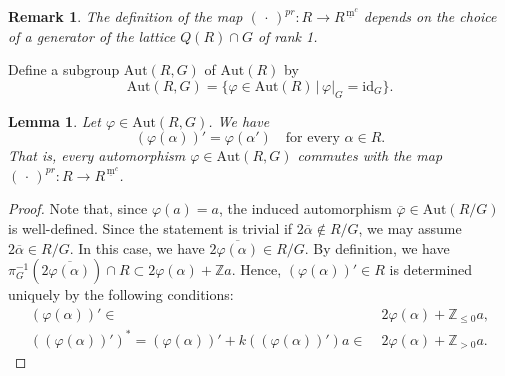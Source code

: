\documentclass[11pt]{amsart}
\newcommand{\Z}{\mathbb{Z}}
\newcommand{\Aut}{\mathrm{Aut}}
\newcommand{\mc}{\, \underline{\mathrm{m}}^c}
\newtheorem{lemma}[thm]{Lemma}%
\newtheorem{rem}[thm]{Remark}%
\begin{document}
{\begin{rem}\label{rem:a}
The definition of the map $(\,\cdot\,)^{pr}:R\to R^{\mc}$ depends on the choice of a 
generator of the lattice $Q(R)\cap G$ of rank 1.
\end{rem}

Define a subgroup $\Aut(R,G)$ of $\Aut(R)$ by
\[ \Aut(R,G)=\{\varphi\in \Aut(R)\,|\, \varphi|_G=\mathrm{id}_G\}.\]

\begin{lemma}\label{lemma:commutativity-prime}
Let $\varphi\in  \Aut(R,G)$. We have 
\begin{equation}\label{commutativity-prime}
(\varphi(\alpha))'=\varphi(\alpha')\quad  \text{for every $\alpha\in R$}.
\end{equation}
That is, every automorphism $\varphi\in \Aut(R,G)$ commutes with 
the map $(\,\cdot\, )^{pr}:R\to R^{\mc}$. 
\end{lemma}
\begin{proof}
Note that, since $\varphi(a)=a$, the induced automorphism 
$\overline{\varphi}\in\mathrm{Aut}(R/G)$ is well-defined. 
Since the statement is trivial if $2\overline{\alpha}\not\in R/G$, we may 
assume $2\overline{\alpha}\in R/G$. 
In this case, we have $2\overline{\varphi(\alpha)}\in R/G$. 
By definition, we have
$\pi_G^{-1}(2\overline{\varphi(\alpha)})\cap R\subset 2\varphi(\alpha)+\Z a$. 
Hence, $(\varphi(\alpha))'\in R$ is determined uniquely by the following conditions:
\begin{align*}
(\varphi(\alpha))'\in 
&\; 2\varphi(\alpha)+\Z_{\leq 0}a, \\
((\varphi(\alpha))')^*=
(\varphi(\alpha))'+k((\varphi(\alpha))')a\in 
&\; 2\varphi(\alpha)+\Z_{> 0}a.
\end{align*}


\end{proof}}
\end{document}

